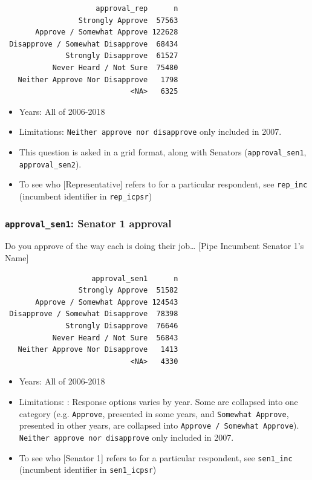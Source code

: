 \documentclass[10pt,article,oneside]{memoir}
\theoremstyle{definition}
\begin{document}
\begin{verbatim}
                     approval_rep      n
                 Strongly Approve  57563
       Approve / Somewhat Approve 122628
 Disapprove / Somewhat Disapprove  68434
              Strongly Disapprove  61527
           Never Heard / Not Sure  75480
   Neither Approve Nor Disapprove   1798
                             <NA>   6325
\end{verbatim}

\begin{itemize}
\tightlist
\item
  Years: All of 2006-2018
\item
  Limitations: \texttt{Neither\ approve\ nor\ disapprove} only included
  in 2007.
\item
  This question is asked in a grid format, along with Senators
  (\texttt{approval\_sen1}, \texttt{approval\_sen2}).
\item
  To see who {[}Representative{]} refers to for a particular respondent,
  see \texttt{rep\_inc} (incumbent identifier in \texttt{rep\_icpsr})
\end{itemize}

\hypertarget{approval_sen1-senator-1-approval}{%
\subsubsection{\texorpdfstring{\texttt{approval\_sen1}: Senator 1
approval}{approval\_sen1: Senator 1 approval}}\label{approval_sen1-senator-1-approval}}

Do you approve of the way each is doing their job\ldots{} {[}Pipe
Incumbent Senator 1's Name{]}

\begin{verbatim}
                    approval_sen1      n
                 Strongly Approve  51582
       Approve / Somewhat Approve 124543
 Disapprove / Somewhat Disapprove  78398
              Strongly Disapprove  76646
           Never Heard / Not Sure  56843
   Neither Approve Nor Disapprove   1413
                             <NA>   4330
\end{verbatim}

\begin{itemize}
\tightlist
\item
  Years: All of 2006-2018
\item
  Limitations: : Response options varies by year. Some are collapsed
  into one category (e.g. \texttt{Approve}, presented in some years, and
  \texttt{Somewhat\ Approve}, presented in other years, are collapsed
  into \texttt{Approve\ /\ Somewhat\ Approve}).
  \texttt{Neither\ approve\ nor\ disapprove} only included in 2007.
\item
  To see who {[}Senator 1{]} refers to for a particular respondent, see
  \texttt{sen1\_inc} (incumbent identifier in \texttt{sen1\_icpsr})
\end{itemize}
\end{document}
